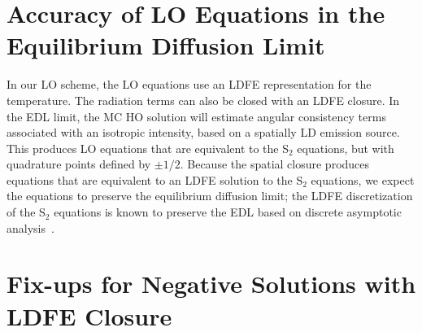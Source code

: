 

\section{Accuracy of LO Equations in the Equilibrium Diffusion Limit}
\label{sec:edl_overview}

In our LO scheme, the
LO equations use an LDFE representation for the temperature.  The radiation terms can also
be closed with an LDFE closure.  In the EDL limit, the MC HO
solution will estimate angular consistency terms associated with an isotropic intensity,
based on a spatially LD emission source.  This produces LO equations that are equivalent to
the S$_2$ equations, but with quadrature points defined by $\pm 1/2$.  Because the spatial closure produces equations that are equivalent to an LDFE
solution to the S$_2$ equations, we expect the equations to preserve the equilibrium diffusion
limit; the LDFE discretization of the S$_2$ equations is known to preserve the EDL based on discrete asymptotic analysis~\cite{morel_ldtrt}.

\section{Fix-ups for Negative Solutions with LDFE Closure}
\label{sec:ldfe_fixups}

